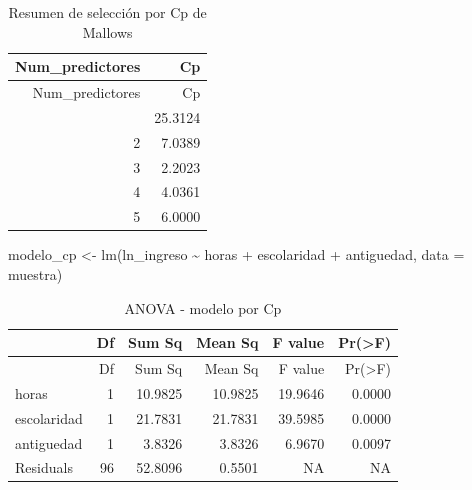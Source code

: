 \documentclass[
  spanish,
  letterpaper,
  DIV=11,
  numbers=noendperiod]{scrartcl}
\newenvironment{Shaded}{\begin{snugshade}}{\end{snugshade}}
\newcommand{\AttributeTok}[1]{\textcolor[rgb]{0.40,0.45,0.13}{#1}}
\newcommand{\DecValTok}[1]{\textcolor[rgb]{0.68,0.00,0.00}{#1}}
\newcommand{\FunctionTok}[1]{\textcolor[rgb]{0.28,0.35,0.67}{#1}}
\newcommand{\NormalTok}[1]{\textcolor[rgb]{0.00,0.23,0.31}{#1}}
\newcommand{\OtherTok}[1]{\textcolor[rgb]{0.00,0.23,0.31}{#1}}
\newcommand{\SpecialCharTok}[1]{\textcolor[rgb]{0.37,0.37,0.37}{#1}}
\newcommand{\StringTok}[1]{\textcolor[rgb]{0.13,0.47,0.30}{#1}}
\begin{document}
\begin{Shaded}
\end{Shaded}

\begin{longtable}[]{@{}rr@{}}
\caption{Resumen de selección por Cp de Mallows}\tabularnewline
\toprule\noalign{}
Num\_predictores & Cp \\
\midrule\noalign{}
\endfirsthead
\toprule\noalign{}
Num\_predictores & Cp \\
\midrule\noalign{}
\endhead
\bottomrule\noalign{}
\endlastfoot
1 & 25.3124 \\
2 & 7.0389 \\
3 & 2.2023 \\
4 & 4.0361 \\
5 & 6.0000 \\
\end{longtable}

\begin{Shaded}
\begin{Highlighting}[]
\NormalTok{modelo\_cp }\OtherTok{\textless{}{-}} \FunctionTok{lm}\NormalTok{(ln\_ingreso }\SpecialCharTok{\textasciitilde{}}\NormalTok{ horas }\SpecialCharTok{+}\NormalTok{ escolaridad }\SpecialCharTok{+}\NormalTok{ antiguedad, }\AttributeTok{data =}\NormalTok{ muestra)}
\end{Highlighting}
\end{Shaded}

\begin{longtable}[]{@{}lrrrrr@{}}
\caption{ANOVA - modelo por Cp}\tabularnewline
\toprule\noalign{}
& Df & Sum Sq & Mean Sq & F value & Pr(\textgreater F) \\
\midrule\noalign{}
\endfirsthead
\toprule\noalign{}
& Df & Sum Sq & Mean Sq & F value & Pr(\textgreater F) \\
\midrule\noalign{}
\endhead
\bottomrule\noalign{}
\endlastfoot
horas & 1 & 10.9825 & 10.9825 & 19.9646 & 0.0000 \\
escolaridad & 1 & 21.7831 & 21.7831 & 39.5985 & 0.0000 \\
antiguedad & 1 & 3.8326 & 3.8326 & 6.9670 & 0.0097 \\
Residuals & 96 & 52.8096 & 0.5501 & NA & NA \\
\end{longtable}
\end{document}
